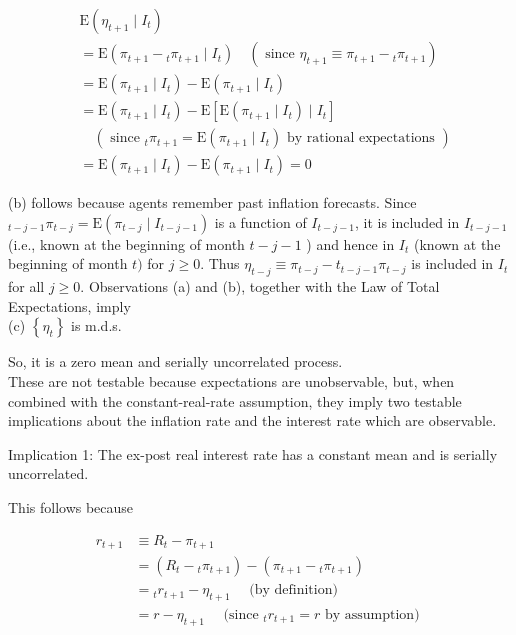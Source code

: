 \documentclass[10pt]{article}
\begin{document}
\begin{align*}
& \mathrm{E}\left(\eta_{t+1} \mid I_{t}\right) \\
& =\mathrm{E}\left(\pi_{t+1}-{ }_{t} \pi_{t+1} \mid I_{t}\right) \quad\left(\text { since } \eta_{t+1} \equiv \pi_{t+1}-{ }_{t} \pi_{t+1}\right) \\
& =\mathrm{E}\left(\pi_{t+1} \mid I_{t}\right)-\mathrm{E}\left(\pi_{t+1} \mid I_{t}\right) \\
& =\mathrm{E}\left(\pi_{t+1} \mid I_{t}\right)-\mathrm{E}\left[\mathrm{E}\left(\pi_{t+1} \mid I_{t}\right) \mid I_{t}\right] \\
& \quad\left(\text { since }{ }_{t} \pi_{t+1}=\mathrm{E}\left(\pi_{t+1} \mid I_{t}\right) \text { by rational expectations }\right) \\
& =\mathrm{E}\left(\pi_{t+1} \mid I_{t}\right)-\mathrm{E}\left(\pi_{t+1} \mid I_{t}\right)=0 \tag{2.11.1}
\end{align*}


(b) follows because agents remember past inflation forecasts. Since ${ }_{t-j-1} \pi_{t-j}= \mathrm{E}\left(\pi_{t-j} \mid I_{t-j-1}\right)$ is a function of $I_{t-j-1}$, it is included in $I_{t-j-1}$ (i.e., known at the beginning of month $t-j-1$ ) and hence in $I_{t}$ (known at the beginning of month $t)$ for $j \geq 0$. Thus $\eta_{t-j} \equiv \pi_{t-j}-t_{t-j-1} \pi_{t-j}$ is included in $I_{t}$ for all $j \geq 0$. Observations (a) and (b), together with the Law of Total Expectations, imply\\
(c) $\left\{\eta_{t}\right\}$ is m.d.s.

So, it is a zero mean and serially uncorrelated process.\\
These are not testable because expectations are unobservable, but, when combined with the constant-real-rate assumption, they imply two testable implications about the inflation rate and the interest rate which are observable.

Implication 1: The ex-post real interest rate has a constant mean and is serially uncorrelated.

This follows because


\begin{align*}
r_{t+1} & \equiv R_{t}-\pi_{t+1} \\
& =\left(R_{t}-{ }_{t} \pi_{t+1}\right)-\left(\pi_{t+1}-{ }_{t} \pi_{t+1}\right) \\
& ={ }_{t} r_{t+1}-\eta_{t+1} \quad \text { (by definition) } \\
& =r-\eta_{t+1} \quad \text { (since }{ }_{t} r_{t+1}=r \text { by assumption) } \tag{2.11.2}
\end{align*}
\end{document}
